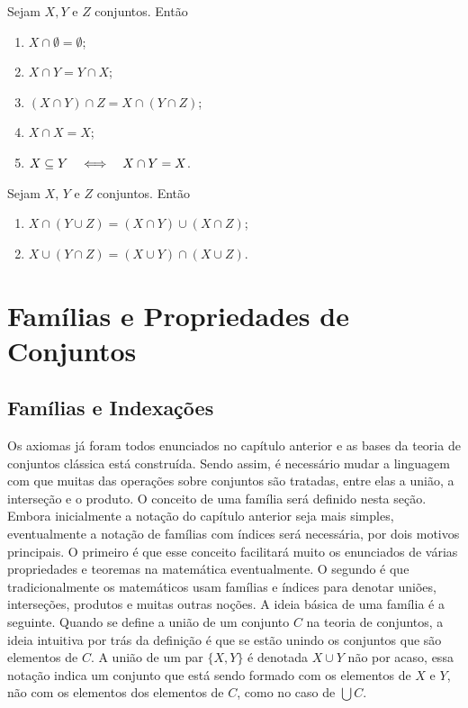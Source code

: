 \begin{prop}
Sejam $X,Y$ e $Z$ conjuntos. Então
	\begin{enumerate}
	\item $X \cap \emptyset = \emptyset$;
	\item $X \cap Y = Y \cap X$;
	\item $(X \cap Y) \cap Z = X \cap (Y \cap Z)$;
	\item $X \cap X = X$;
	\item $X \subseteq Y \quad \Longleftrightarrow \quad X \cap Y = X$.
	\end{enumerate}
\end{prop}

\begin{prop}
Sejam $X$, $Y$ e $Z$ conjuntos. Então
	\begin{enumerate}
	\item $X \cap (Y \cup Z) = (X \cap Y) \cup (X \cap Z)$;
	\item $X \cup (Y \cap Z) = (X \cup Y) \cap (X \cup Z)$.
	\end{enumerate}
\end{prop}

\chapter{Famílias e Propriedades de Conjuntos}

\section{Famílias e Indexações}

Os axiomas já foram todos enunciados no capítulo anterior e as bases da teoria de conjuntos clássica está construída. Sendo assim, é necessário mudar a linguagem com que muitas das operações sobre conjuntos são tratadas, entre elas a união, a interseção e o produto. O conceito de uma família será definido nesta seção. Embora inicialmente a notação do capítulo anterior seja mais simples, eventualmente a notação de famílias com índices será necessária, por dois motivos principais. O primeiro é que esse conceito facilitará muito os enunciados de várias propriedades e teoremas na matemática eventualmente. O segundo é que tradicionalmente os matemáticos usam famílias e índices para denotar uniões, interseções, produtos e muitas outras noções. A ideia básica de uma família é a seguinte. Quando se define a união de um conjunto $C$ na teoria de conjuntos, a ideia intuitiva por trás da definição é que se estão unindo os conjuntos que são elementos de $C$. A união de um par $\{X,Y\}$ é denotada $X \cup Y$ não por acaso, essa notação indica um conjunto que está sendo formado com os elementos de $X$ e $Y$, não com os elementos dos elementos de $C$, como no caso de $\bigcup C$. 

